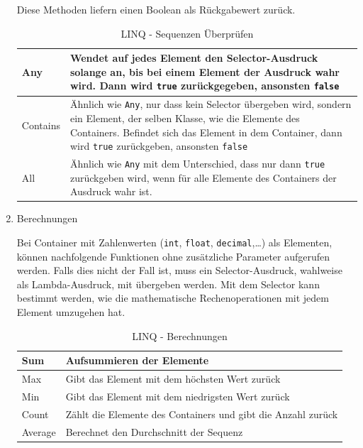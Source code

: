 \begin{enumerate}
Diese Methoden liefern einen Boolean als Rückgabewert zurück.

\bigskip
\begin{table}[H]
	\centering
\begin{tabularx}{\textwidth}{|p{130 pt}|X|}
		\hline
Any & Wendet auf jedes Element den Selector-Ausdruck solange an, bis bei einem Element der Ausdruck wahr wird. Dann wird \texttt{true} zurückgegeben, ansonsten \texttt{false}\\	\hline
Contains & Ähnlich wie \texttt{Any}, nur dass kein Selector übergeben wird, sondern ein Element, der selben Klasse, wie die Elemente des Containers. Befindet sich das Element in dem Container, dann wird \texttt{true} zurückgeben, ansonsten \texttt{false}\\	\hline
All & Ähnlich wie \texttt{Any} mit dem Unterschied, dass nur dann \texttt{true} zurückgeben wird, wenn für alle Elemente des Containers der Ausdruck wahr ist.\\	\hline
\end{tabularx}
	\medskip
	\caption{LINQ - Sequenzen Überprüfen}
\end{table}

\item Berechnungen

Bei Container mit Zahlenwerten (\texttt{int}, \texttt{float}, \texttt{decimal},\ldots{}) als Elementen,
können nachfolgende Funktionen ohne zusätzliche Parameter aufgerufen werden.
Falls dies nicht der Fall ist, muss ein Selector-Ausdruck, wahlweise als
Lambda-Ausdruck, mit übergeben werden. Mit dem Selector kann bestimmt werden, wie
die mathematische Rechenoperationen mit jedem Element umzugehen hat.

\bigskip
\begin{table}[H]
	\centering
\begin{tabularx}{\textwidth}{|p{130pt}|X|}
	\hline
Sum & Aufsummieren der Elemente\\ 	\hline
Max & Gibt das Element mit dem höchsten Wert zurück\\	\hline
Min & Gibt das Element mit dem niedrigsten Wert zurück\\ 	\hline
Count & Zählt die Elemente des Containers und gibt die Anzahl zurück\\	\hline
Average & Berechnet den Durchschnitt der Sequenz\\	\hline
\end{tabularx}
	\medskip
	\caption{LINQ - Berechnungen}
\end{table}


\end{enumerate}
